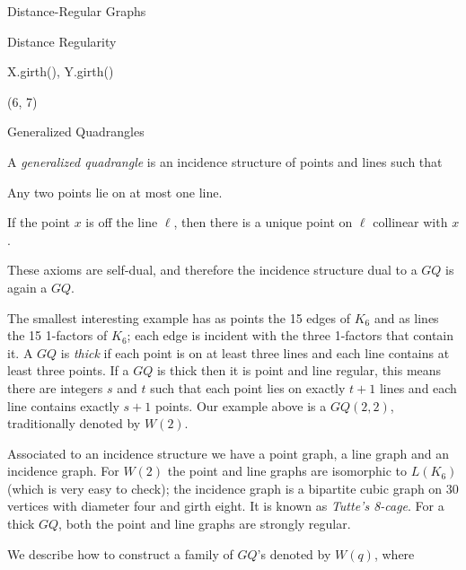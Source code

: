\begin{chap}{Distance-Regular Graphs}
\begin{sect}{Distance Regularity}
\begin{sagecode}
\begin{sageinput}
X.girth(), Y.girth()
\end{sageinput}
\begin{sageoutput}
(6, 7)
\end{sageoutput}
\end{sagecode}
%
\end{sect}
%
\begin{sect}{Generalized Quadrangles}
%
\begin{para}
A \textsl{generalized quadrangle} is an incidence structure of points
and lines such that
\end{para}
%
\begin{enumerate}
    \begin{listitem}
    Any two points lie on at most one line.
    \end{listitem}
    \begin{listitem}
    If the point $x$ is off the line $\ell$, then there is a unique
    point on $\ell$ collinear with $x$.
    \end{listitem}
\end{enumerate}
%
\begin{para}
These axioms are self-dual, and therefore the incidence structure
dual to a $GQ$ is again a $GQ$.
\end{para}
%
\begin{para}
The smallest interesting example has as points the 15 edges of $K_6$ and
as lines the 15 1-factors of $K_6$; each edge is incident with the three
1-factors that contain it. A $GQ$ is \textsl{thick} if each point is on at least 
three lines and each line contains at least three points. If a $GQ$ is thick then
it is point and line regular, this means there are integers $s$ and $t$ such that
each point lies on exactly $t+1$ lines and each line contains exactly $s+1$
points. Our example above is a $GQ(2,2)$, traditionally denoted by $W(2)$.
\end{para}
%
\begin{para}
Associated to an incidence structure we have a point graph, a line graph
and an incidence graph.  For $W(2)$ the point and line graphs are isomorphic
to $L(K_6)$ (which is very easy to check); the incidence graph is
a bipartite cubic graph on 30 vertices with diameter four and girth eight.
It is known as \textsl{Tutte's 8-cage}. For a thick $GQ$, both the point
and line graphs are strongly regular.
\end{para}
%
\begin{para}
We describe how to construct a family of $GQ$'s denoted by $W(q)$, where

\end{para}
\end{sect}
\end{chap}

